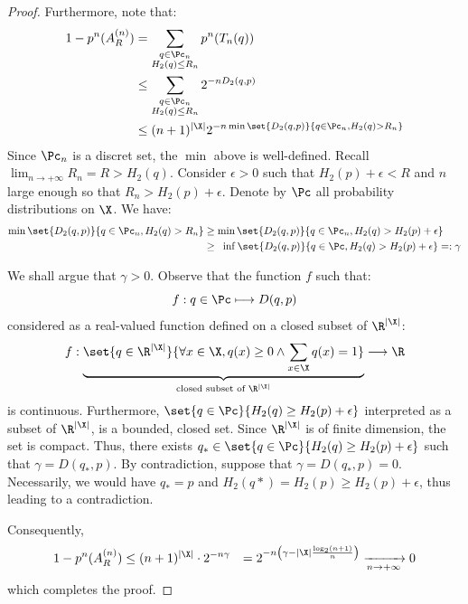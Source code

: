 \documentclass[toc, titlepaged]{../cs-classes/cs-classes}
\begin{document}
\begin{proof}
    Furthermore, note that:
    \begin{equation*}
        \begin{aligned}
            1- p^n(A_R^{(n)}) &= \sum_{\substack{q\in\Pc_n\\H_2(q)\leq R_n}} p^n(T_n(q))\\
            &\leq \sum_{\substack{q\in\Pc_n\\H_2(q)\leq R_n}} 2^{-nD_2(q, p)}\\
            &\leq (n+1)^{|\X|}2^{-n\min\set{D_2(q, p)}{q\in\Pc_n, H_2(q)>R_n}}
        \end{aligned}
    \end{equation*}
    Since $\Pc_n$ is a discret set, the $\min$ above is well-defined. Recall $\lim_{n\to+\infty}R_n=R>H_2(q)$. Consider $\epsilon>0$ such that $H_2(p)+\epsilon<R$ and $n$ large enough so that $R_n>H_2(p)+\epsilon$. Denote by $\Pc$ all probability distributions on $\X$. We have:
    \begin{equation*}
        \begin{aligned}
            \min\set{D_2(q, p)}{q\in\Pc_n, H_2(q)>R_n} 
            &\geq \min\set{D_2(q, p)}{q\in\Pc_n, H_2(q)>H_2(p)+\epsilon}\\
            &\geq \phantom{i}\inf\set{D_2(q, p)}{q\in\Pc, H_2(q)>H_2(p)+\epsilon} =: \gamma
        \end{aligned}
    \end{equation*}

    We shall argue that $\gamma>0$. Observe that the function $f$ such that:
    \begin{equation*}
        f:q\in\Pc \longmapsto D(q, p)
    \end{equation*}
    considered as a real-valued function defined on a closed subset of $\R^{|\X|}$:
    \begin{equation*}
        f : \underbrace{\set{q\in\R^{|\X|}}{\forall x\in\X, q(x)\geq 0 \land \sum_{x\in\X} q(x) = 1}}_{\textnormal{closed subset of }\R^{|\X|}} \longrightarrow \R
    \end{equation*}
    is continuous. Furthermore, $\set{q\in\Pc}{H_2(q)\geq H_2(p)+\epsilon}$ interpreted as a subset of $\R^{|\X|}$, is a bounded, closed set. Since $\R^{|\X|}$ is of finite dimension, the set is compact. Thus, there exists $q_*\in\set{q\in\Pc}{H_2(q)\geq H_2(p)+\epsilon}$ such that $\gamma=D(q_*, p)$. By contradiction, suppose that $\gamma=D(q_*, p)=0$. Necessarily, we would have $q_*=p$ and $H_2(q*)=H_2(p)\geq H_2(p)+\epsilon$, thus leading to a contradiction. 
    
    Consequently,
    \begin{equation*}
        \begin{aligned}
            1-p^n(A_R^{(n)}) &\leq (n+1)^{|\X|}\cdot 2^{-n\gamma}
            &= 2^{-n\left(\gamma-|\X|\frac{\log_2(n+1)}{n}\right)} \xrightarrow[n\to+\infty]{} 0
        \end{aligned}
    \end{equation*}
    which completes the proof.
\end{proof}
\end{document}

